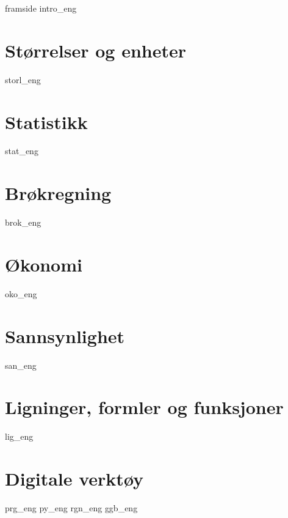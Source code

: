 








{framside}
{intro_eng}
\newpage
\tableofcontents

\chapter{Størrelser og enheter \label{Storlogenh}}
\newpage

{storl_eng}

\chapter{Statistikk \label{Statistikk}}
\newpage
{stat_eng}

\chapter{Brøkregning \label{BrokAM}}
\newpage
{brok_eng}
\newpage

\chapter{Økonomi \label{Okonomi}}
\newpage
{oko_eng}

\chapter{Sannsynlighet \label{Sannsyn}} 
\newpage
{san_eng}

\chapter{Ligninger, formler og funksjoner \label{LigningerAM}}
\newpage
{lig_eng}

\chapter{Digitale verktøy \label{Dig}}
{prg_eng}
{py_eng}
{rgn_eng}	
{ggb_eng}	

